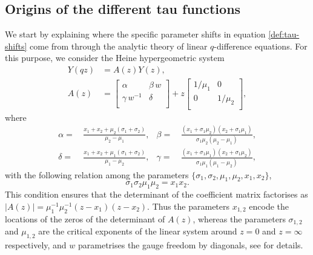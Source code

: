 \documentclass[a4paper,reqno,11pt]{amsart}
\numberwithin{equation}{section}
\numberwithin{figure}{section}
\theoremstyle{plain}
\theoremstyle{remark}
\numberwithin{rhp}{section}
\begin{document}
\subsection{Origins of the different tau functions}\label{sec:origins}
We start by explaining where the specific parameter shifts in equation \eqref{def:tau-shifts} come from through the analytic theory of linear $q$-difference equations. For this purpose, we consider the Heine hypergeometric system
\begin{align}
    Y(qz)&=A(z)Y(z),\label{eq:hypsystem}\\
    A(z)&=\begin{bmatrix}
    \alpha & \beta\, w\\
    \gamma\, w^{-1} & \delta\\
    \end{bmatrix}+z \begin{bmatrix}
    1/\mu_1 & 0\\
    0 & 1/\mu_2\\
    \end{bmatrix},\nonumber
\end{align}
where
\begin{align*}
    \alpha=&\,\frac{x_1+x_2+\mu_2(\sigma_1+\sigma_2)}{\mu_2-\mu_1}, &    \beta=&\,\frac{(x_1+\sigma_1\mu_2)(x_2+\sigma_1\mu_1)}{\sigma_1\mu_2(\mu_2-\mu_1)},\\
    \delta=&\,\frac{x_1+x_2+\mu_1(\sigma_1+\sigma_2)}{\mu_1-\mu_2}, &
    \gamma=&\,\frac{(x_1+\sigma_1\mu_1)(x_2+\sigma_1\mu_2)}{\sigma_1\mu_1(\mu_1-\mu_2)},
\end{align*}
with the following relation among the parameters $\{\sigma_1,\sigma_2,\mu_1,\mu_2,x_1,x_2\}$,
\begin{equation*}
    \sigma_1\sigma_2\mu_1\mu_2=x_1x_2.
\end{equation*}
This condition ensures that the determinant of the coefficient matrix factorises as $|A(z)|=\mu_1^{-1}\mu_2^{-1}(z-x_1)(z-x_2)$. Thus the parameters $x_{1,2}$ encode the locations of the zeros of the determinant of $A(z)$, whereas the parameters $\sigma_{1,2}$ and $\mu_{1,2}$ are the critical exponents of the linear system around $z=0$ and $z=\infty$ respectively, and $w$ parametrises the gauge freedom by diagonals, see \cite[\S 4.2]{roffelsen2024segre} for details.
\end{document}

